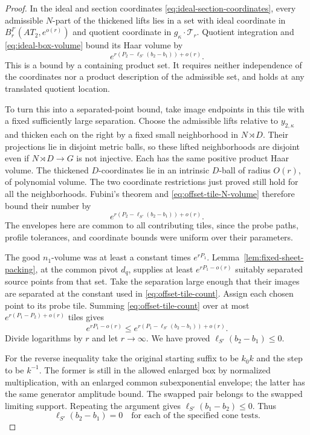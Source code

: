 \begin{proof}
In the ideal and section coordinates \eqref{eq:ideal-section-coordinates},
every admissible $N$-part of the thickened lifts lies in a set with ideal
coordinate in $B^{I'}_r(AT_2,e^{o(r)})$ and quotient coordinate in
$g_\kappa\cdot \mathcal T_r$.  Quotient integration and
\eqref{eq:ideal-box-volume} bound its Haar volume by
\begin{equation}
 e^{r(P_2-\ell_{S'}(b_2-b_1))+o(r)}.
 \label{eq:offset-tile-N-volume}
\end{equation}
This is a bound by a containing product set.  It requires neither
independence of the coordinates nor a product description of the
admissible set, and holds at any translated quotient location.

To turn this into a separated-point bound, take image endpoints in this
tile with a fixed sufficiently large separation.  Choose the admissible
lifts relative to $y_{2,\kappa}$ and thicken each on the right by a fixed small
neighborhood in $N\rtimes D$.  Their projections lie in disjoint metric
balls, so these lifted neighborhoods are disjoint even if
$N\rtimes D\to G$ is not injective.  Each has the same positive product
Haar volume.  The thickened $D$-coordinates lie in an intrinsic $D$-ball
of radius $O(r)$, of polynomial volume.  The two coordinate restrictions
just proved still hold for all the neighborhoods.  Fubini's theorem and
\eqref{eq:offset-tile-N-volume} therefore bound their number by
\begin{equation}
 e^{r(P_2-\ell_{S'}(b_2-b_1))+o(r)}.
 \label{eq:offset-tile-count}
\end{equation}
The envelopes here are common to all contributing tiles, since the probe
paths, profile tolerances, and coordinate bounds were uniform over their
parameters.

The good $n_1$-volume was at least a constant times $e^{rP_1}$.
Lemma~\ref{lem:fixed-sheet-packing}, at the common pivot $d_q$, supplies
at least $e^{rP_1-o(r)}$ suitably separated source points from that set.
Take the separation large enough that their images are separated at the
constant used in \eqref{eq:offset-tile-count}.  Assign each chosen point
to its probe tile.  Summing \eqref{eq:offset-tile-count} over at most
$e^{r(P_1-P_2)+o(r)}$ tiles gives
\[
 e^{rP_1-o(r)}
 \le e^{r(P_1-\ell_{S'}(b_2-b_1))+o(r)}.
\]
Divide logarithms by $r$ and let $r\to\infty$.  We have proved
$\ell_{S'}(b_2-b_1)\le0$.

For the reverse inequality take the original starting suffix to be
$k_0k$ and the step to be $k^{-1}$.  The former is still in the allowed
enlarged box by normalized multiplication, with an enlarged common
subexponential envelope; the latter has the same generator amplitude
bound.  The swapped pair belongs to the swapped limiting support.
Repeating the argument gives $\ell_{S'}(b_1-b_2)\le0$.  Thus
\begin{equation}
 \ell_{S'}(b_2-b_1)=0
 \quad\text{for each of the specified cone tests.}
 \label{eq:offset-traces-vanish}
\end{equation}


\end{proof}
